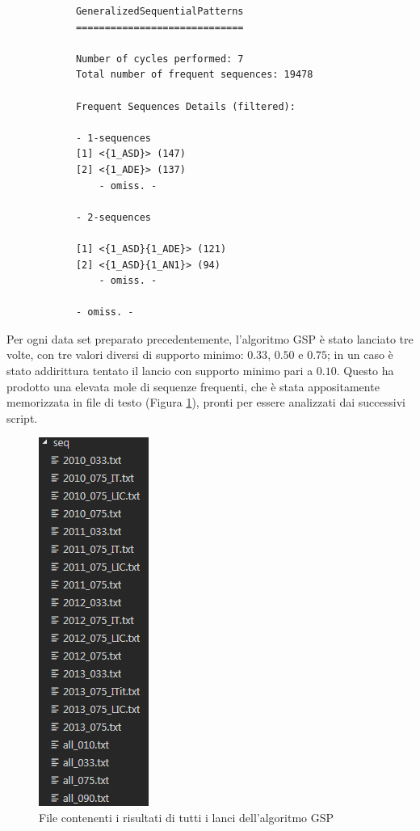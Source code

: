         \begin{lstlisting}
            GeneralizedSequentialPatterns
            =============================

            Number of cycles performed: 7
            Total number of frequent sequences: 19478

            Frequent Sequences Details (filtered):
            
            - 1-sequences
            [1] <{1_ASD}> (147)
            [2] <{1_ADE}> (137)
                - omiss. -

            - 2-sequences

            [1] <{1_ASD}{1_ADE}> (121)
            [2] <{1_ASD}{1_AN1}> (94)
                - omiss. -

            - omiss. -
        \end{lstlisting}

        Per ogni data set preparato precedentemente, l'algoritmo GSP è stato lanciato tre volte, con tre valori diversi di supporto minimo: $0.33$, $0.50$ e $0.75$; in un caso è stato addirittura tentato il lancio con supporto minimo pari a $0.10$. Questo ha prodotto una elevata mole di sequenze frequenti, che è stata appositamente memorizzata in file di testo (Figura \ref{files}), pronti per essere analizzati dai successivi script. \\

        \begin{figure}
            \centering
            \caption{File contenenti i risultati di tutti i lanci dell'algoritmo GSP}
            \label{files}
            \includegraphics[scale=0.75]{img/seq_files.png}
        \end{figure}

